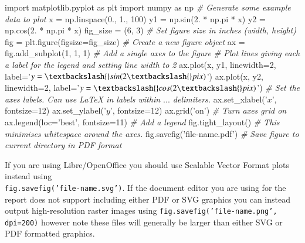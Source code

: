 \documentclass[11pt,]{article}
\newenvironment{Shaded}{}{}
\newcommand{\DecValTok}[1]{\textcolor[rgb]{0.25,0.63,0.44}{{#1}}}
\newcommand{\CharTok}[1]{\textcolor[rgb]{0.25,0.44,0.63}{{#1}}}
\newcommand{\StringTok}[1]{\textcolor[rgb]{0.25,0.44,0.63}{{#1}}}
\newcommand{\CommentTok}[1]{\textcolor[rgb]{0.38,0.63,0.69}{\textit{{#1}}}}
\newcommand{\NormalTok}[1]{{#1}}
\begin{document}
\begin{Shaded}
\begin{Highlighting}[]
\CharTok{import} \NormalTok{matplotlib.pyplot }\CharTok{as} \NormalTok{plt}
\CharTok{import} \NormalTok{numpy }\CharTok{as} \NormalTok{np}
\CommentTok{# Generate some example data to plot}
\NormalTok{x = np.linspace(}\DecValTok{0}\NormalTok{., }\DecValTok{1}\NormalTok{., }\DecValTok{100}\NormalTok{)}
\NormalTok{y1 = np.sin(}\DecValTok{2}\NormalTok{. * np.pi * x)}
\NormalTok{y2 = np.cos(}\DecValTok{2}\NormalTok{. * np.pi * x)}
\NormalTok{fig_size = (}\DecValTok{6}\NormalTok{, }\DecValTok{3}\NormalTok{)  }\CommentTok{# Set figure size in inches (width, height)}
\NormalTok{fig = plt.figure(figsize=fig_size)  }\CommentTok{# Create a new figure object}
\NormalTok{ax = fig.add_subplot(}\DecValTok{1}\NormalTok{, }\DecValTok{1}\NormalTok{, }\DecValTok{1}\NormalTok{)  }\CommentTok{# Add a single axes to the figure}
\CommentTok{# Plot lines giving each a label for the legend and setting line width to 2}
\NormalTok{ax.plot(x, y1, linewidth=}\DecValTok{2}\NormalTok{, label=}\StringTok{'$y = \textbackslash{}sin(2\textbackslash{}pi x)$'}\NormalTok{)}
\NormalTok{ax.plot(x, y2, linewidth=}\DecValTok{2}\NormalTok{, label=}\StringTok{'$y = \textbackslash{}cos(2\textbackslash{}pi x)$'}\NormalTok{)}
\CommentTok{# Set the axes labels. Can use LaTeX in labels within $...$ delimiters.}
\NormalTok{ax.set_xlabel(}\StringTok{'$x$'}\NormalTok{, fontsize=}\DecValTok{12}\NormalTok{)}
\NormalTok{ax.set_ylabel(}\StringTok{'$y$'}\NormalTok{, fontsize=}\DecValTok{12}\NormalTok{)}
\NormalTok{ax.grid(}\StringTok{'on'}\NormalTok{)  }\CommentTok{# Turn axes grid on}
\NormalTok{ax.legend(loc=}\StringTok{'best'}\NormalTok{, fontsize=}\DecValTok{11}\NormalTok{)  }\CommentTok{# Add a legend}
\NormalTok{fig.tight_layout()  }\CommentTok{# This minimises whitespace around the axes.}
\NormalTok{fig.savefig(}\StringTok{'file-name.pdf'}\NormalTok{) }\CommentTok{# Save figure to current directory in PDF format}
\end{Highlighting}
\end{Shaded}

If you are using Libre/OpenOffice you should use Scalable Vector Format
plots instead using \\
\texttt{fig.savefig('file-name.svg')}. If the
document editor you are using for the report does not support including
either PDF or SVG graphics you can instead output high-resolution raster
images using \texttt{fig.savefig('file-name.png', dpi=200)} however note
these files will generally be larger than either SVG or PDF formatted
graphics.
\end{document}
